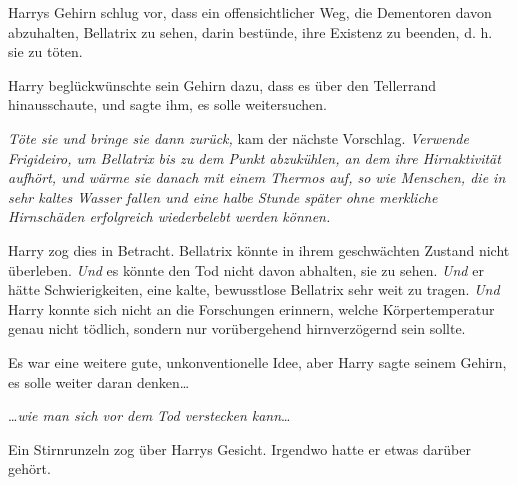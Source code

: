 Harrys Gehirn schlug vor, dass ein offensichtlicher Weg, die Dementoren davon abzuhalten, Bellatrix zu sehen, darin bestünde, ihre Existenz zu beenden, d. h. sie zu töten.

Harry beglückwünschte sein Gehirn dazu, dass es über den Tellerrand hinausschaute, und sagte ihm, es solle weitersuchen.

\emph{Töte sie und bringe sie dann zurück,} kam der nächste Vorschlag. \emph{Verwende Frigideiro, um Bellatrix bis zu dem Punkt abzukühlen, an dem ihre Hirnaktivität aufhört, und wärme sie danach mit einem Thermos auf, so wie Menschen, die in sehr kaltes Wasser fallen und eine halbe Stunde später ohne merkliche Hirnschäden erfolgreich wiederbelebt werden können.}

Harry zog dies in Betracht. Bellatrix könnte in ihrem geschwächten Zustand nicht überleben. \emph{Und} es könnte den Tod nicht davon abhalten, sie zu sehen. \emph{Und} er hätte Schwierigkeiten, eine kalte, bewusstlose Bellatrix sehr weit zu tragen. \emph{Und} Harry konnte sich nicht an die Forschungen erinnern, welche Körpertemperatur genau nicht tödlich, sondern nur vorübergehend hirnverzögernd sein sollte.

Es war eine weitere gute, unkonventionelle Idee, aber Harry sagte seinem Gehirn, es solle weiter daran denken…

…\emph{wie man sich vor dem Tod verstecken kann}…

Ein Stirnrunzeln zog über Harrys Gesicht. Irgendwo hatte er etwas darüber gehört.

